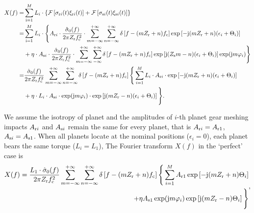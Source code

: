 \documentclass[a4paper,fleqn]{cas-sc}%
\begin{document}
\begin{equation}
    \begin{split}
        X(f) =& \sum_{\rm i=1}^{M} L_i \cdot \left\{\mathcal{F}\left[ \sigma_{{\rm r}i}(t) \xi_{{\rm r}i}(t) \right] + \mathcal{F}\left[\sigma_{{\rm s}i}(t) \xi_{{\rm s}i}(t)\right] \right\}\\
        =&\sum_{\rm i=1}^{M} L_i \cdot \Bigg\{ A_{{\rm r}i} \cdot \frac{\hat{\sigma}_0(f)}{2 \pi Z_{\rm r} f_{\rm c}^{2}} \cdot  \sum_{m=-\infty}^{+\infty} \sum_{n=-\infty}^{+\infty} \delta\left[f-(mZ_{\rm r}+n)f_{\rm c}\right] \exp\left[-{\rm j}(m Z_{\rm r}+n)(\epsilon_i+\Theta_i)\right] 
        \\
        &+\eta \cdot A_{{\rm s}i} \cdot \frac{\hat{\sigma}_0(f)}{2 \pi  Z_{\rm r} f_{\rm c}^2} \cdot \sum_{m=-\infty}^{+\infty} \sum_{-\infty}^{+\infty} \delta\left[f-(m Z_{\rm r}+ n)f_{\rm c} \right] \exp\left[ {\rm j} (Z_{\rm s} m - n)(\epsilon_i+\Theta_i) \right] \exp({\rm j}m\varphi_i) \Bigg\}\\
        =&\frac{\hat{\sigma}_0(f)}{2\pi Z_{\rm r} f_{\rm c}^{2}} \sum_{m=-\infty}^{+\infty} \sum_{n=-\infty}^{+\infty} \delta\left[f-(m Z_{\rm r}+n) f_{\rm c} \right] \Bigg\{ \sum_{i=1}^{M} L_i \cdot A_{{\rm r}i} \cdot \exp\left[ -{\rm j}(m Z_{\rm r}+n)(\epsilon_i+\Theta_i)\right]\\
        &+\eta \cdot L_i \cdot A_{{\rm s}i} \cdot \exp({\rm j}m\varphi_i) \cdot\exp\left[{\rm j}(m Z_{\rm r}-n)(\epsilon_i+\Theta_i) \right] \Bigg\}.
    \end{split}
\end{equation}
\par We assume the isotropy of planet and the amplitudes of $i$-th planet gear meshing impacts $A_{{\rm r}i}$ and $A_{{\rm s}i}$ remain the same for every planet, that is $A_{{\rm r}i}=A_{{\rm r}1}$, $A_{{\rm s}i}=A_{{\rm s}1} $. When all planets locate at the nominal positions ($\epsilon_i=0$), each planet bears the same torque ($L_i=L_1$), The Fourier transform $X(f)$ in the ‘perfect’ case is
\begin{equation}
    \begin{align}
        X(f)=\frac{L_1 \cdot \hat{\sigma}_0(f)}{2\pi Z_{\rm r} f_{\rm c}^{2}} \sum_{m=-\infty}^{+\infty} \sum_{n=-\infty}^{+\infty} \delta\left[f-(m Z_{\rm r}+n) f_{\rm c} \right] 
              \Bigg\{ \sum_{i=1}^{M}  A_{{\rm r}1}  \exp\left[ -{\rm j}(m Z_{\rm r}+n)\Theta_i\right]\\
              +\eta A_{{\rm s}1}\exp({\rm j}m\varphi_i) \exp\left[{\rm j}(m Z_{\rm r}-n)\Theta_i \right]\Bigg\}
    \end{align},%
\end{equation}
\end{document}
